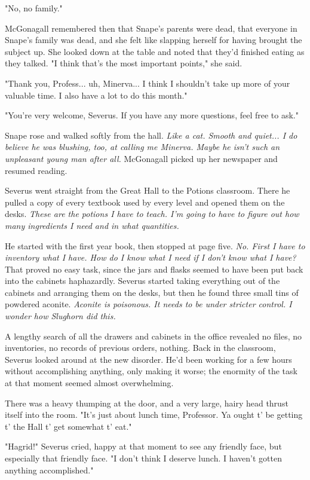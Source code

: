 \documentclass[a4paper,11pt]{article}
\begin{document}
"No, no family."

McGonagall remembered then that Snape's parents were dead, that everyone in Snape's family was dead, and she felt like slapping herself for having brought the subject up. She looked down at the table and noted that they'd finished eating as they talked. "I think that's the most important points," she said.

"Thank you, Profess... uh, Minerva... I think I shouldn't take up more of your valuable time. I also have a lot to do this month."

"You're very welcome, Severus. If you have any more questions, feel free to ask."

Snape rose and walked softly from the hall. \emph{Like a cat. Smooth and quiet... I do believe he was blushing, too, at calling me Minerva. Maybe he isn't such an unpleasant young man after all.} McGonagall picked up her newspaper and resumed reading.

Severus went straight from the Great Hall to the Potions classroom. There he pulled a copy of every textbook used by every level and opened them on the desks. \emph{These are the potions I have to teach. I'm going to have to figure out how many ingredients I need and in what quantities.}

He started with the first year book, then stopped at page five. \emph{No. First I have to inventory what I have. How do I know what I need if I don't know what I have?} That proved no easy task, since the jars and flasks seemed to have been put back into the cabinets haphazardly. Severus started taking everything out of the cabinets and arranging them on the desks, but then he found three small tins of powdered aconite. \emph{Aconite is poisonous. It needs to be under stricter control. I wonder how Slughorn did this.}

A lengthy search of all the drawers and cabinets in the office revealed no files, no inventories, no records of previous orders, nothing. Back in the classroom, Severus looked around at the new disorder. He'd been working for a few hours without accomplishing anything, only making it worse; the enormity of the task at that moment seemed almost overwhelming.

There was a heavy thumping at the door, and a very large, hairy head thrust itself into the room. "It's just about lunch time, Professor. Ya ought t' be getting t' the Hall t' get somewhat t' eat."

"Hagrid!" Severus cried, happy at that moment to see any friendly face, but especially that friendly face. "I don't think I deserve lunch. I haven't gotten anything accomplished."
\end{document}
